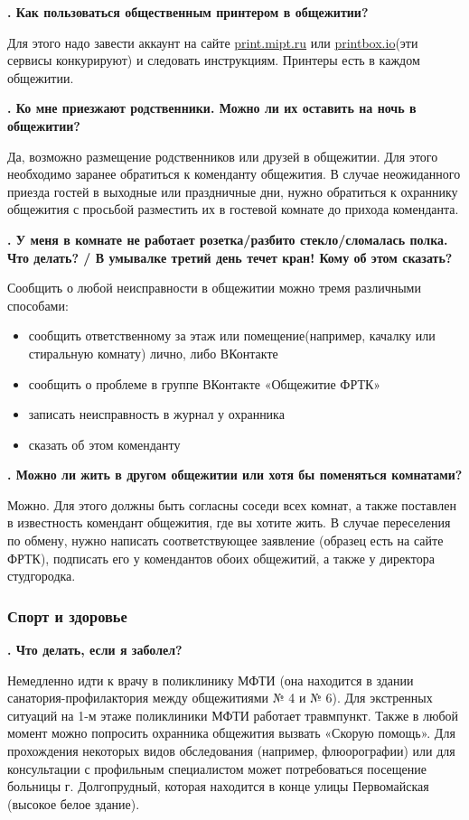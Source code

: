 \documentclass[14pt]{extarticle}
\newcounter{question}
\newcommand\Que[1]{%
    \begin{minipage}{\textwidth}
    \leavevmode\par
    \stepcounter{question}
    \noindent
    {\large\textbf{\thequestion. #1}}\par}
\newcommand\Ans[2][]{%
    \leavevmode\par\noindent
    {\leftskip37pt
    \textbf{#1}#2\par}
    \end{minipage}}
\newcommand\Partans[2][]{%
    \leavevmode\par\noindent
    {\leftskip37pt
    \textbf{#1}#2\par}}
\begin{document}
\Que{Как пользоваться общественным принтером в общежитии?}
\Ans{Для этого надо завести аккаунт на сайте \href{http://print.mipt.ru}{print.mipt.ru} или \href{https://printbox.io/}{printbox.io}(эти сервисы конкурируют) и следовать инструкциям. Принтеры есть в каждом общежитии.}

\Que{Ко мне приезжают родственники. Можно ли их оставить на ночь в общежитии?}
\Ans{Да, возможно размещение родственников или друзей в общежитии. Для этого необходимо заранее обратиться к коменданту общежития. В случае неожиданного приезда гостей в выходные или праздничные дни, нужно обратиться к охраннику общежития с просьбой разместить их в гостевой комнате до прихода коменданта.}

\Que{У меня в комнате не работает розетка/разбито стекло/сломалась полка. Что делать? / В умывалке третий день течет кран! Кому об этом сказать?}

\Partans{Сообщить о любой неисправности в общежитии можно тремя различными способами:}
\begin{itemize}
    \item сообщить ответственному за этаж или помещение(например, качалку или стиральную комнату) лично, либо ВКонтакте
    \item сообщить о проблеме в группе ВКонтакте «Общежитие ФРТК»
    \item записать неисправность в журнал у охранника
    \item сказать об этом коменданту
\end{itemize}
\end{minipage}

\Que{Можно ли жить в другом общежитии или хотя бы поменяться комнатами?}
\Ans{Можно. Для этого должны быть согласны соседи всех комнат, а также поставлен в известность комендант общежития, где вы хотите жить. В случае переселения по обмену, нужно написать соответствующее заявление (образец есть на сайте ФРТК), подписать его у комендантов обоих общежитий, а также у директора студгородка.}

\subsubsection{Спорт и здоровье}

\Que{Что делать, если я заболел?}
\Ans{Немедленно идти к врачу в поликлинику МФТИ (она находится в здании санатория-профилактория между общежитиями № 4 и № 6). Для экстренных ситуаций на 1-м этаже поликлиники МФТИ работает травмпункт. Также в любой момент можно попросить охранника общежития вызвать «Скорую помощь». Для прохождения некоторых видов обследования (например, флюорографии) или для консультации с профильным специалистом может потребоваться посещение больницы г. Долгопрудный, которая находится в конце улицы Первомайская (высокое белое здание).}
\end{document}
